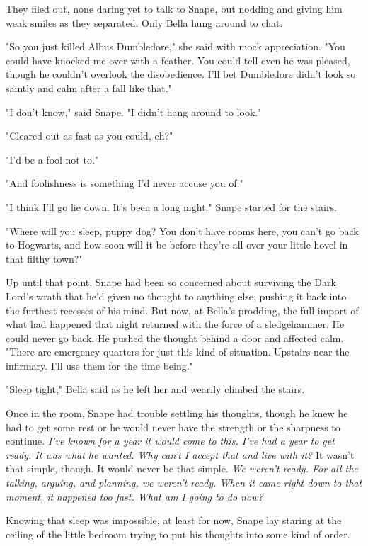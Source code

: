 \documentclass[a4paper,11pt]{article}
\begin{document}
They filed out, none daring yet to talk to Snape, but nodding and giving him weak smiles as they separated. Only Bella hung around to chat.

"So you just killed Albus Dumbledore," she said with mock appreciation. "You could have knocked me over with a feather. You could tell even he was pleased, though he couldn't overlook the disobedience. I'll bet Dumbledore didn't look so saintly and calm after a fall like that."

"I don't know," said Snape. "I didn't hang around to look."

"Cleared out as fast as you could, eh?"

"I'd be a fool not to."

"And foolishness is something I'd never accuse you of."

"I think I'll go lie down. It's been a long night." Snape started for the stairs.

"Where will you sleep, puppy dog? You don't have rooms here, you can't go back to Hogwarts, and how soon will it be before they're all over your little hovel in that filthy town?"

Up until that point, Snape had been so concerned about surviving the Dark Lord's wrath that he'd given no thought to anything else, pushing it back into the furthest recesses of his mind. But now, at Bella's prodding, the full import of what had happened that night returned with the force of a sledgehammer. He could never go back. He pushed the thought behind a door and affected calm. "There are emergency quarters for just this kind of situation. Upstairs near the infirmary. I'll use them for the time being."

"Sleep tight," Bella said as he left her and wearily climbed the stairs.

Once in the room, Snape had trouble settling his thoughts, though he knew he had to get some rest or he would never have the strength or the sharpness to continue. \emph{I've known for a year it would come to this. I've had a year to get ready. It was what he wanted. Why can't I accept that and live with it?} It wasn't that simple, though. It would never be that simple. \emph{We weren't ready. For all the talking, arguing, and planning, we weren't ready. When it came right down to that moment, it happened too fast. What am I going to do now?}

Knowing that sleep was impossible, at least for now, Snape lay staring at the ceiling of the little bedroom trying to put his thoughts into some kind of order.
\end{document}
